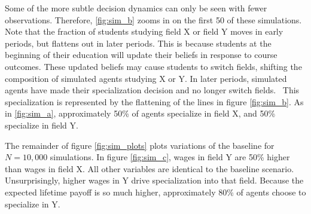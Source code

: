 Some of the more subtle decision dynamics can only be seen with fewer observations. Therefore, \ref{fig:sim_b} zooms in on the first 50 of these simulations.
Note that the fraction of students studying field X or field Y moves in early periods, but flattens out in later periods. 
This is because students at the beginning of their education will update their beliefs in response to course outcomes.
These updated beliefs may cause students to switch fields, shifting the composition of simulated agents studying X or Y.
In later periods, simulated agents have made their specialization decision and no longer switch fields. \
This specialization is represented by the flattening of the lines in figure \ref{fig:sim_b}.
As in \ref{fig:sim_a}, approximately 50\% of agents specialize in field X, and 50\% specialize in field Y. 

\begin{figure}[t!]
\centering

\label{fig:beta_change}
\end{figure}

The remainder of figure \ref{fig:sim_plots} plots variations of the baseline for $N = 10,000$ simulations.
In figure \ref{fig:sim_c}, wages in field Y are 50\% higher than wages in field X. 
All other variables are identical to the baseline scenario. 
Unsurprisingly, higher wages in Y drive specialization into that field.
Because the expected lifetime payoff is so much higher, approximately 80\% of agents choose to specialize in Y.

